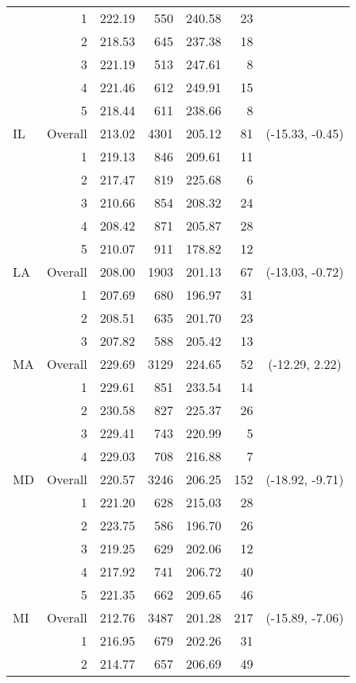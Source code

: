 \begin{longtable}{lrrr@{\extracolsep{.25cm}}rrc}
   & 1 & 222.19 & 550 & 240.58 &  23 &  \\ 
   & 2 & 218.53 & 645 & 237.38 &  18 &  \\ 
   & 3 & 221.19 & 513 & 247.61 &   8 &  \\ 
   & 4 & 221.46 & 612 & 249.91 &  15 &  \\ 
   & 5 & 218.44 & 611 & 238.66 &   8 &  \\ 
   \hline
IL & Overall & 213.02 & 4301 & 205.12 &  81 & (-15.33,  -0.45) \\ 
   & 1 & 219.13 & 846 & 209.61 &  11 &  \\ 
   & 2 & 217.47 & 819 & 225.68 &   6 &  \\ 
   & 3 & 210.66 & 854 & 208.32 &  24 &  \\ 
   & 4 & 208.42 & 871 & 205.87 &  28 &  \\ 
   & 5 & 210.07 & 911 & 178.82 &  12 &  \\ 
   \hline
LA & Overall & 208.00 & 1903 & 201.13 &  67 & (-13.03,  -0.72) \\ 
   & 1 & 207.69 & 680 & 196.97 &  31 &  \\ 
   & 2 & 208.51 & 635 & 201.70 &  23 &  \\ 
   & 3 & 207.82 & 588 & 205.42 &  13 &  \\ 
   \hline
MA & Overall & 229.69 & 3129 & 224.65 &  52 & (-12.29,   2.22) \\ 
   & 1 & 229.61 & 851 & 233.54 &  14 &  \\ 
   & 2 & 230.58 & 827 & 225.37 &  26 &  \\ 
   & 3 & 229.41 & 743 & 220.99 &   5 &  \\ 
   & 4 & 229.03 & 708 & 216.88 &   7 &  \\ 
   \hline
MD & Overall & 220.57 & 3246 & 206.25 & 152 & (-18.92,  -9.71) \\ 
   & 1 & 221.20 & 628 & 215.03 &  28 &  \\ 
   & 2 & 223.75 & 586 & 196.70 &  26 &  \\ 
   & 3 & 219.25 & 629 & 202.06 &  12 &  \\ 
   & 4 & 217.92 & 741 & 206.72 &  40 &  \\ 
   & 5 & 221.35 & 662 & 209.65 &  46 &  \\ 
   \hline
MI & Overall & 212.76 & 3487 & 201.28 & 217 & (-15.89,  -7.06) \\ 
   & 1 & 216.95 & 679 & 202.26 &  31 &  \\ 
   & 2 & 214.77 & 657 & 206.69 &  49 &  \\ 

\end{longtable}
